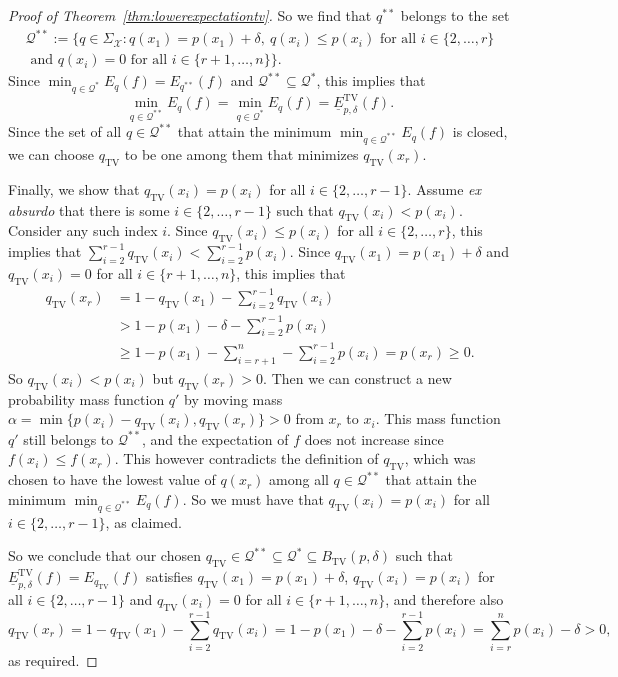 \documentclass{article}
\begin{document}
\begin{proof}[Proof of Theorem~\ref{thm:lowerexpectationtv}]
So we find that $q^{**}$ belongs to the set
\begin{multline*}
\mathcal{Q}^{**}:=\{q\in\Sigma_\mathcal{X}: q(x_1)=p(x_1)+\delta,~q(x_i)\leq p(x_i)\text{ for all }i\in\{2,\ldots,r\}\\\text{ and }q(x_i)=0\text{ for all }i\in\{r+1,\ldots,n\}\}.
\end{multline*}
Since $\min_{q\in\mathcal{Q}^*} E_q(f)=E_{q^{**}}(f)$ and $\mathcal{Q}^{**}\subseteq\mathcal{Q}^*$, this implies that
\begin{equation*}
\min_{q\in\mathcal{Q}^{**}} E_q(f)=\min_{q\in\mathcal{Q}^*}E_q(f)=\underline{E}^\mathrm{TV}_{p,\delta}(f).
\end{equation*}
Since the set of all $q\in\mathcal{Q}^{**}$ that attain the minimum $\min_{q\in\mathcal{Q}^{**}} E_q(f)$ is closed, we can choose $q_\mathrm{TV}$ to be one among them that minimizes $q_\mathrm{TV}(x_r)$.

Finally, we show that $q_\mathrm{TV}(x_i)=p(x_i)$ for all $i\in\{2,\ldots,r-1\}$. Assume \emph{ex absurdo} that there is some $i\in\{2,\ldots,r-1\}$ such that $q_\mathrm{TV}(x_i)<p(x_i)$. Consider any such index $i$. Since $q_\mathrm{TV}(x_i)\leq p(x_i)$ for all $i\in\{2,\ldots,r\}$, this implies that $\sum_{i=2}^{r-1} q_\mathrm{TV}(x_i)<\sum_{i=2}^{r-1} p(x_i)$. Since $q_\mathrm{TV}(x_1)=p(x_1)+\delta$ and $q_\mathrm{TV}(x_i)=0$ for all $i\in\{r+1,\ldots,n\}$, this implies that
\begin{align*}
q_{\mathrm{TV}}(x_r)
&=1-q_{\mathrm{TV}}(x_1)-\sum_{i=2}^{r-1} q_{\mathrm{TV}}(x_i)\\
&>1-p(x_1)-\delta-\sum_{i=2}^{r-1} p(x_i)\\
&\geq1-p(x_1)-\sum_{i=r+1}^n-\sum_{i=2}^{r-1}p(x_i)=p(x_r)\geq0.
\end{align*}
So $q_\mathrm{TV}(x_i)<p(x_i)$ but $q_{\mathrm{TV}}(x_r)>0$. Then we can construct a new probability mass function $q'$ by moving mass $\alpha=\min\{p(x_i)-q_\mathrm{TV}(x_i),q_\mathrm{TV}(x_r)\}>0$ from $x_r$ to $x_i$. This mass function $q'$ still belongs to $\mathcal{Q}^{**}$, and the expectation of $f$ does not increase since $f(x_i)\leq f(x_r)$. This however contradicts the definition of $q_\mathrm{TV}$, which was chosen to have the lowest value of $q(x_r)$ among all $q\in\mathcal{Q}^{**}$ that attain the minimum $\min_{q\in\mathcal{Q}^{**}} E_q(f)$. So we must have that $q_\mathrm{TV}(x_i)=p(x_i)$ for all $i\in\{2,\ldots,r-1\}$, as claimed.

So we conclude that our chosen $q_\mathrm{TV}\in\mathcal{Q}^{**}\subseteq\mathcal{Q}^*\subseteq B_\mathrm{TV}(p,\delta)$ such that $\underline{E}^\mathrm{TV}_{p,\delta}(f)=E_{q_\mathrm{TV}}(f)$ satisfies $q_\mathrm{TV}(x_1)=p(x_1)+\delta$, $q_\mathrm{TV}(x_i)=p(x_i)$ for all $i\in\{2,\ldots,r-1\}$ and $q_\mathrm{TV}(x_i)=0$ for all $i\in\{r+1,\ldots,n\}$, and therefore also
\begin{equation*}
q_\mathrm{TV}(x_r)=1-q_\mathrm{TV}(x_1)-\sum_{i=2}^{r-1} q_\mathrm{TV}(x_i)=1-p(x_1)-\delta-\sum_{i=2}^{r-1} p(x_i)=\sum_{i=r}^{n} p(x_i)-\delta>0,
\end{equation*}
as required.
\end{proof}
\end{document}
